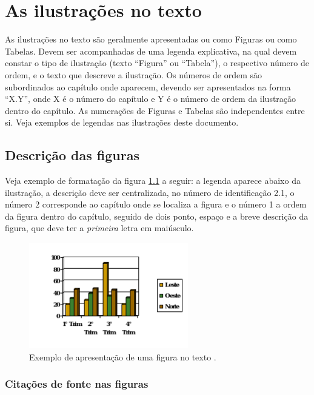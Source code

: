 \chapter{As ilustrações no texto}

As ilustrações no texto são geralmente apresentadas ou como Figuras ou como Tabelas. Devem ser acompanhadas de uma legenda explicativa, na qual devem constar o tipo de ilustração (texto ``Figura'' ou ``Tabela''), o respectivo número de ordem, e o texto que descreve a ilustração. Os números de ordem são subordinados ao capítulo onde aparecem, devendo ser apresentados na forma ``X.Y'', onde X é o número do capítulo e Y é o número de ordem da ilustração dentro do capítulo. As numerações de Figuras e Tabelas são independentes entre si. Veja exemplos de legendas nas ilustrações deste documento.

\section{Descrição das figuras}

Veja exemplo de formatação da figura \ref{fig:grafico} a seguir: a legenda aparece abaixo da ilustração, a descrição deve ser centralizada, no número de identificação 2.1, o número 2 corresponde ao capítulo onde se localiza a figura e o número 1 a ordem da figura dentro do capítulo, seguido de dois ponto, espaço e a breve descrição da figura, que deve ter a \emph{primeira} letra em maiúsculo.

\begin{figure}[h]
    \centerline{\includegraphics{imagens/img-grafico.png}}
    \caption[Exemplo de apresentação de uma figura no texto]{Exemplo de apresentação de uma figura no texto \cite{meregali2004}.}
    \label{fig:grafico}
\end{figure}

\subsection{Citações de fonte nas figuras}

